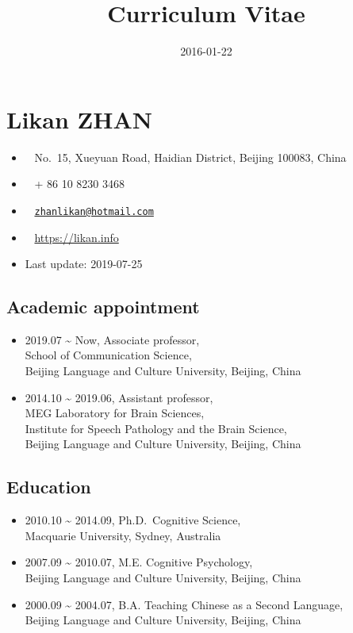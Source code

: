 \documentclass[12pt,]{article}
\title{Curriculum Vitae}
\author{}
\date{2016-01-22}
\providecommand{\tightlist}{%
  \setlength{\itemsep}{0pt}\setlength{\parskip}{0pt}}
\begin{document}
\maketitle

\hypertarget{likan-zhan}{%
\section{Likan ZHAN}\label{likan-zhan}}

\begin{itemize}
\tightlist
\item
  \faUniversity ~ No.~15, Xueyuan Road, Haidian District, Beijing
  100083, China
\item
  \faPhone* ~ + 86 10 8230 3468
\item
  \faEnvelope[regular] ~
  \href{mailto:zhanlikan@hotmail.com}{\nolinkurl{zhanlikan@hotmail.com}}
\item
  \faGlobe ~ \url{https://likan.info}
\item
  Last update: 2019-07-25
\end{itemize}

\hypertarget{academic-appointment}{%
\subsection{Academic appointment}\label{academic-appointment}}

\begin{itemize}
\item
  2019.07 \textasciitilde{} Now, Associate professor,\\
  School of Communication Science,\\
  Beijing Language and Culture University, Beijing, China
\item
  2014.10 \textasciitilde{} 2019.06, Assistant professor,\\
  MEG Laboratory for Brain Sciences, \\
  Institute for Speech Pathology and the Brain Science,\\
  Beijing Language and Culture University, Beijing, China
\end{itemize}

\hypertarget{education}{%
\subsection{Education}\label{education}}

\begin{itemize}
\item
  2010.10 \textasciitilde{} 2014.09, Ph.D.~Cognitive Science, \\
  Macquarie University, Sydney, Australia
\item
  2007.09 \textasciitilde{} 2010.07, M.E. Cognitive Psychology, \\
  Beijing Language and Culture University, Beijing, China
\item
  2000.09 \textasciitilde{} 2004.07, B.A. Teaching Chinese as a Second
  Language, \\
  Beijing Language and Culture University, Beijing, China
\end{itemize}
\end{document}
